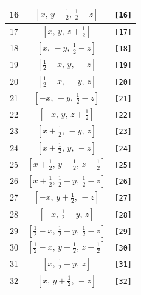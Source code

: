 \documentclass[fleqn,8pt]{jsarticle}
\begin{document}
\begin{longtable}{ccc}
16 & $\left[ x,\, y + \frac{1}{2},\, \frac{1}{2} - z \right]$ & {\tt [16]} \\ \hline
17 & $\left[ x,\, y,\, z + \frac{1}{2} \right]$ & {\tt [17]} \\ \hline
18 & $\left[ x,\, - y,\, \frac{1}{2} - z \right]$ & {\tt [18]} \\ \hline
19 & $\left[ \frac{1}{2} - x,\, y,\, - z \right]$ & {\tt [19]} \\ \hline
20 & $\left[ \frac{1}{2} - x,\, - y,\, z \right]$ & {\tt [20]} \\ \hline
21 & $\left[ - x,\, - y,\, \frac{1}{2} - z \right]$ & {\tt [21]} \\ \hline
22 & $\left[ - x,\, y,\, z + \frac{1}{2} \right]$ & {\tt [22]} \\ \hline
23 & $\left[ x + \frac{1}{2},\, - y,\, z \right]$ & {\tt [23]} \\ \hline
24 & $\left[ x + \frac{1}{2},\, y,\, - z \right]$ & {\tt [24]} \\ \hline
25 & $\left[ x + \frac{1}{2},\, y + \frac{1}{2},\, z + \frac{1}{2} \right]$ & {\tt [25]} \\ \hline
26 & $\left[ x + \frac{1}{2},\, \frac{1}{2} - y,\, \frac{1}{2} - z \right]$ & {\tt [26]} \\ \hline
27 & $\left[ - x,\, y + \frac{1}{2},\, - z \right]$ & {\tt [27]} \\ \hline
28 & $\left[ - x,\, \frac{1}{2} - y,\, z \right]$ & {\tt [28]} \\ \hline
29 & $\left[ \frac{1}{2} - x,\, \frac{1}{2} - y,\, \frac{1}{2} - z \right]$ & {\tt [29]} \\ \hline
30 & $\left[ \frac{1}{2} - x,\, y + \frac{1}{2},\, z + \frac{1}{2} \right]$ & {\tt [30]} \\ \hline
31 & $\left[ x,\, \frac{1}{2} - y,\, z \right]$ & {\tt [31]} \\ \hline
32 & $\left[ x,\, y + \frac{1}{2},\, - z \right]$ & {\tt [32]} \\
\end{longtable}
\end{document}
